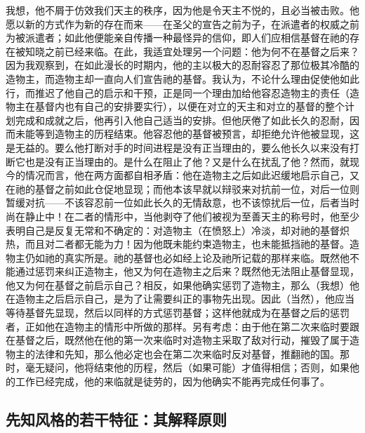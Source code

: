 我想，他不屑于仿效我们天主的秩序，因为他是令天主不悦的，且必当被击败。他愿以新的方式作为新的存在而来——在圣父的宣告之前为子，在派遣者的权威之前为被派遣者；如此他便能亲自传播一种最怪异的信仰，即人们应相信基督在祂的存在被知晓之前已经来临。在此，我适宜处理另一个问题：他为何不在基督之后来？因为我观察到，在如此漫长的时期内，他的主以极大的忍耐容忍了那位极其冷酷的造物主，而造物主却一直向人们宣告祂的基督。我认为，不论什么理由促使他如此行，而推迟了他自己的启示和干预，正是同一个理由加给他容忍造物主的责任（造物主在基督内也有自己的安排要实行），以便在对立的天主和对立的基督的整个计划完成和成就之后，他再引入他自己适当的安排。但他厌倦了如此长久的忍耐，因而未能等到造物主的历程结束。他容忍他的基督被预言，却拒绝允许他被显现，这是无益的。要么他打断对手的时间进程是没有正当理由的，要么他长久以来没有打断它也是没有正当理由的。是什么在阻止了他？又是什么在扰乱了他？然而，就现今的情况而言，他在两方面都自相矛盾：他在造物主之后如此迟缓地启示自己，又在祂的基督之前如此仓促地显现；而他本该早就以辩驳来对抗前一位，对后一位则暂缓对抗——不该容忍前一位如此长久的无情敌意，也不该惊扰后一位，后者当时尚在静止中！在二者的情形中，当他剥夺了他们被视为至善天主的称号时，他至少表明自己是反复无常和不确定的：对造物主（在愤怒上）冷淡，却对祂的基督炽热，而且对二者都无能为力！因为他既未能约束造物主，也未能抵挡祂的基督。造物主仍如祂的真实所是。祂的基督也必如经上论及祂所记载的那样来临。既然他不能通过惩罚来纠正造物主，他又为何在造物主之后来？既然他无法阻止基督显现，他又为何在基督之前启示自己？相反，如果他确实惩罚了造物主，那么（我想）他在造物主之后启示自己，是为了让需要纠正的事物先出现。因此（当然），他应当等待基督先显现，然后以同样的方式惩罚基督；这样他就成为在基督之后的惩罚者，正如他在造物主的情形中所做的那样。另有考虑：由于他在第二次来临时要跟在基督之后，既然他在他的第一次来临时对造物主采取了敌对行动，摧毁了属于造物主的法律和先知，那么他必定也会在第二次来临时反对基督，推翻祂的国。那时，毫无疑问，他将结束他的历程，然后（如果可能）才值得相信；否则，如果他的工作已经完成，他的来临就是徒劳的，因为他确实不能再完成任何事了。\par


\subsection{先知风格的若干特征：其解释原则}

